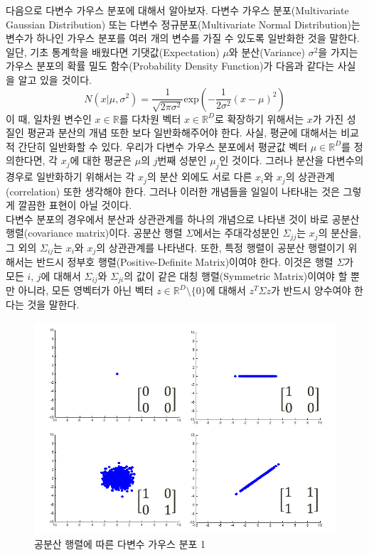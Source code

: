 \documentclass[a4paper]{oblivoir}
\begin{document}
다음으로 다변수 가우스 분포에 대해서 알아보자. 다변수 가우스 분포(Multivariate Gaussian Distribution) 또는 다변수 정규분포(Multivariate Normal Distribution)는 변수가 하나인 가우스 분포를 여러 개의 변수를 가질 수 있도록 일반화한 것을 말한다. 일단, 기초 통계학을 배웠다면 기댓값(Expectation) $\mu$와 분산(Variance) $\sigma^2$을 가지는 가우스 분포의 확률 밀도 함수(Probability Density Function)가 다음과 같다는 사실을 알고 있을 것이다. 
\begin{equation}
N(x|\mu, \sigma^2) = \frac{1}{\sqrt{2 \pi \sigma^2}} \textrm{exp}(-\frac{1}{2 \sigma^2} (x-\mu)^2) \label{eq:8-13} 
\end{equation}
이 때, 일차원 변수인 $x \in \mathbb{R}$를 다차원 벡터 $ {x} \in {\mathbb{R}}^{D}$로 확장하기 위해서는 $x$가 가진 성질인 평균과 분산의 개념 또한 보다 일반화해주어야 한다. 사실, 평균에 대해서는 비교적 간단히 일반화할 수 있다. 우리가 다변수 가우스 분포에서 평균값 벡터 $ {\mu} \in {\mathbb{R}}^{D}$를 정의한다면, 각 $x_j$에 대한 평균은 $ {\mu}$의 $j$번째 성분인 $\mu_j$인 것이다. 그러나 분산을 다변수의 경우로 일반화하기 위해서는 각 $x_j$의 분산 외에도 서로 다른 $x_i$와 $x_j$의 상관관계(correlation) 또한 생각해야 한다. 그러나 이러한 개념들을 일일이 나타내는 것은 그렇게 깔끔한 표현이 아닐 것이다. \\

다변수 분포의 경우에서 분산과 상관관계를 하나의 개념으로 나타낸 것이 바로 공분산 행렬(covariance matrix)이다. 공분산 행렬 $ {\Sigma}$에서는 주대각성분인 $ {\Sigma}_{jj}$는 $x_j$의 분산을, 그 외의 $ {\Sigma}_{ij}$는 $x_i$와 $x_j$의 상관관계를 나타낸다. 또한, 특정 행렬이 공분산 행렬이기 위해서는 반드시 정부호 행렬(Positive-Definite Matrix)이여야 한다. 이것은 행렬 $ {\Sigma}$가 모든 $i$, $j$에 대해서 $ {\Sigma}_{ij}$와 $ {\Sigma}_{ji}$의 값이 같은 대칭 행렬(Symmetric Matrix)이여야 할 뿐만 아니라, 모든 영벡터가 아닌 벡터 $ {z} \in {\mathbb{R}}^{D} \setminus \{  {0} \}$에 대해서 $ {z}^{T}  {\Sigma}  {z}$가 반드시 양수여야 한다는 것을 말한다. \\

\begin{figure}[ht] \centering 
\includegraphics[scale=0.6]{fig8_7.png} 
\caption{공분산 행렬에 따른 다변수 가우스 분포 1}
\label{fig:8-7}
\end{figure} 
\end{document}

